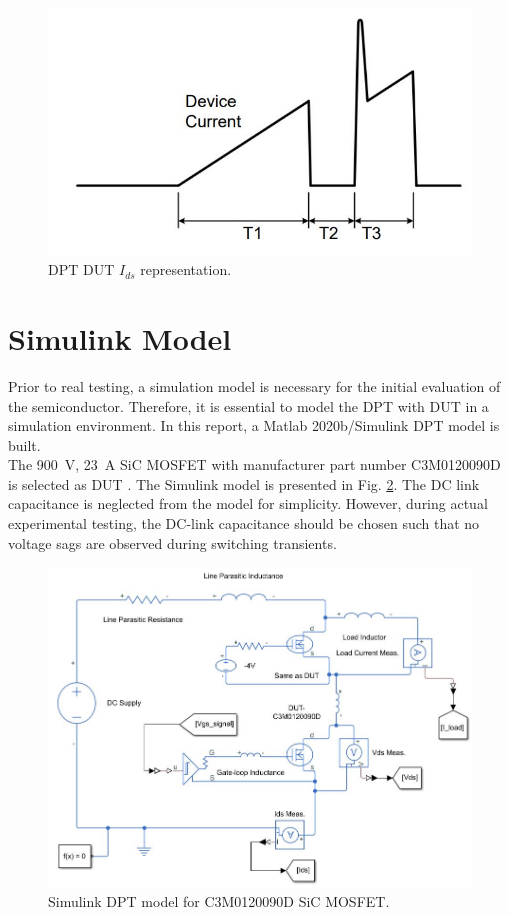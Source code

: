 \documentclass[12pt]{article} %
\begin{document}
\begin{figure}[h!]
	\includegraphics[scale=0.7]{figures/DPT_timing.JPG}
	\caption{DPT DUT $I_{ds}$ representation.}
	\label{fig:DPTtiming}
\end{figure}

\section{Simulink Model}

Prior to real testing, a simulation model is necessary for the initial evaluation of the semiconductor. Therefore, it is essential to model the DPT with DUT in a simulation environment. In this report, a Matlab 2020b/Simulink DPT model is built.\\

The 900~V, 23~A SiC MOSFET with manufacturer part number C3M0120090D is selected as DUT \cite{Cree}. The Simulink model is presented in Fig. \ref{fig:simulinkmodel}. The DC link capacitance is neglected from the model for simplicity. However, during actual experimental testing, the DC-link capacitance should be chosen such that no voltage sags are observed during switching transients. 

\begin{figure}[h!]
	\includegraphics[scale=0.6]{figures/Simulink_circuit.JPG}
	\caption{Simulink DPT model for C3M0120090D SiC MOSFET. }
	\label{fig:simulinkmodel}
\end{figure}
\end{document}
